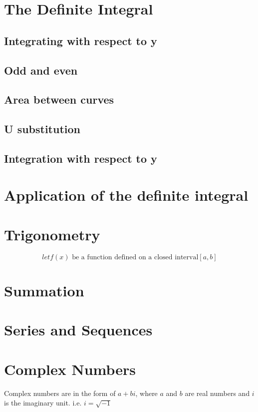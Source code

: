 \documentclass[a4paper,12pt]{book}
\newcommand{\highlightmath}[1]{\begin{tcolorbox}[colback=yellow!10!white, colframe=red!50!black, boxrule=0.5mm]#1\end{tcolorbox}}
\begin{document}
\chapter{The Definite Integral}

\section{Integrating with respect to y}

\section{Odd and even}
\section{Area between curves}
\section{U substitution}

\section{Integration with respect to y}
\chapter{Application of the definite integral}
\chapter{Trigonometry}

\highlightmath{
\[
let f(x) \text{ be a function defined on a closed interval} [a, b]
\]
}
\chapter{Summation}


\chapter{Series and Sequences}

\chapter{Complex Numbers}
Complex numbers are in the form of \( a + bi \), where \( a \) and \( b \) are real numbers and \( i \) is the imaginary unit.
i.e. \( i = \sqrt{-1} \)
\end{document}
